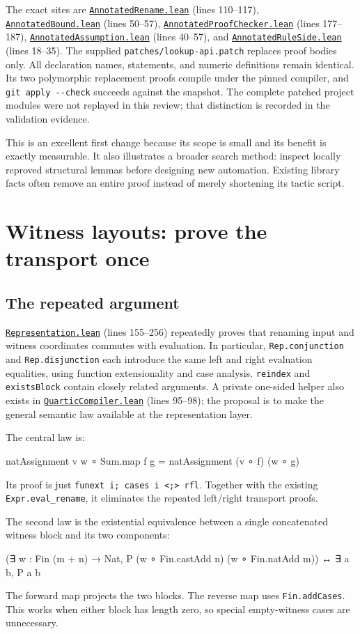 \documentclass[11pt,letterpaper]{article}
\newcommand{\code}[1]{\nolinkurl{#1}}
\newcommand{\src}[2]{\href{https://github.com/VladimirReshetnikov/ProveIt/blob/60e9c5d620c6c387d932876cfa2d9376f64ea56c/Computability/DiophantineConsistency/Lean/DiophantineConsistency/#1.lean}{\nolinkurl{#1.lean}} (lines #2)}
\begin{document}
The exact sites are \src{AnnotatedRename}{110--117},
\src{AnnotatedBound}{50--57}, \src{AnnotatedProofChecker}{177--187},
\src{AnnotatedAssumption}{40--57}, and \src{AnnotatedRuleSide}{18--35}.
The supplied \code{patches/lookup-api.patch} replaces proof bodies only.
All declaration names, statements, and numeric definitions remain identical.
Its two polymorphic replacement proofs compile under the pinned compiler,
and \code{git apply --check} succeeds against the snapshot. The complete
patched project modules were not replayed in this review; that distinction
is recorded in the validation evidence.

This is an excellent first change because its scope is small and its
benefit is exactly measurable. It also illustrates a broader search
method: inspect locally reproved structural lemmas before designing new
automation. Existing library facts often remove an entire proof instead
of merely shortening its tactic script.

\section{Witness layouts: prove the transport once}

\subsection{The repeated argument}

\src{Representation}{155--256} repeatedly proves that renaming input and
witness coordinates commutes with evaluation. In particular,
\code{Rep.conjunction} and \code{Rep.disjunction} each introduce the same
left and right evaluation equalities, using function extensionality and
case analysis. \code{reindex} and \code{existsBlock} contain closely
related arguments. A private one-sided helper also exists in
\src{QuarticCompiler}{95--98}; the proposal is to make the general
semantic law available at the representation layer.

The central law is:
\begin{Lean}
natAssignment v w ∘ Sum.map f g =
  natAssignment (v ∘ f) (w ∘ g)
\end{Lean}
Its proof is just \code{funext i; cases i <;> rfl}. Together with the
existing \code{Expr.eval_rename}, it eliminates the repeated left/right
transport proofs.

The second law is the existential equivalence between a single concatenated
witness block and its two components:
\begin{Lean}
(∃ w : Fin (m + n) → Nat,
  P (w ∘ Fin.castAdd n) (w ∘ Fin.natAdd m)) ↔
    ∃ a b, P a b
\end{Lean}
The forward map projects the two blocks. The reverse map uses
\code{Fin.addCases}. This works when either block has length zero, so
special empty-witness cases are unnecessary.
\end{document}
